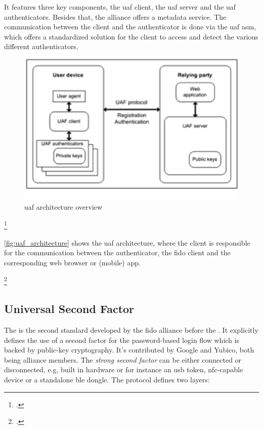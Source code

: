 It features three key components, the \gls{uaf} client, the \gls{uaf} server and the \gls{uaf} authenticators. Besides that, the alliance offers a metadata service. The communication between the client and the authenticator is done via the \gls{uaf} \gls{asm}, which offers a standardized solution for the client to access and detect the various different authenticators.

\begin{figure}[hbt]
	\centering
	\includegraphics[width=\textwidth]{pics/Picture1}
	\caption[\gls{uaf} architecture overview]{\gls{uaf} architecture overview\footnotemark}
	\label{fig:uaf_architecture}
\end{figure}
\footcitetext[Source: diagram by author, based on][4]{uaf-overview}

\autoref{fig:uaf_architecture} shows the \gls{uaf} architecture, where the client is responsible for the communication between the authenticator, the \gls{fido} client and the corresponding web browser or (mobile) app.

\footcites[See][191]{7897543}[See][131]{10.1007/978-3-319-67639-5_11}[See][]{uaf-asm}


\subsection{Universal Second Factor}

The  is the second standard developed by the \gls{fido} alliance before the \wa. It explicitly defines the use of a second factor for the password-based login flow which is backed by public-key cryptography. It's contributed by Google and Yubico, both being alliance members. The \textit{strong second factor} can be either connected or disconnected, e.g, built in hardware or for instance an \gls{usb} token, \gls{nfc}-capable device or a standalone \gls{ble} dongle. The protocol defines two layers:

